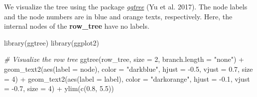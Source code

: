 \documentclass[]{article}
\newcommand{\hlnum}[1]{\textcolor[rgb]{0.816,0.125,0.439}{#1}}%
\newcommand{\hlstr}[1]{\textcolor[rgb]{0.251,0.627,0.251}{#1}}%
\newcommand{\hlcom}[1]{\textcolor[rgb]{0.502,0.502,0.502}{\textit{#1}}}%
\newcommand{\hlopt}[1]{\textcolor[rgb]{0,0,0}{#1}}%
\newcommand{\hlstd}[1]{\textcolor[rgb]{0.251,0.251,0.251}{#1}}%
\newcommand{\hlkwc}[1]{\textcolor[rgb]{0.251,0.251,0.251}{#1}}%
\newcommand{\hlkwd}[1]{\textcolor[rgb]{0.878,0.439,0.125}{#1}}%
\newenvironment{Shaded}{\begin{myshaded}}{\end{myshaded}}
\newcommand{\KeywordTok}[1]{\hlkwd{#1}}
\newcommand{\DataTypeTok}[1]{\hlkwc{#1}}
\newcommand{\DecValTok}[1]{\hlnum{#1}}
\newcommand{\FloatTok}[1]{\hlnum{#1}}
\newcommand{\StringTok}[1]{\hlstr{#1}}
\newcommand{\CommentTok}[1]{\hlcom{#1}}
\newcommand{\OperatorTok}[1]{\hlopt{#1}}
\newcommand{\NormalTok}[1]{\hlstd{#1}}
\begin{document}
\begin{Shaded}
\end{Shaded}

We visualize the tree using the package \emph{\href{https://bioconductor.org/packages/3.11/ggtree}{ggtree}} (Yu et al. 2017). The node labels and the node numbers are in blue and orange texts, respectively. Here, the
internal nodes of the \textbf{row\_tree} have no labels.

\begin{Shaded}
\begin{Highlighting}[]
\KeywordTok{library}\NormalTok{(ggtree)}
\KeywordTok{library}\NormalTok{(ggplot2)}

\CommentTok{# Visualize the row tree}
\KeywordTok{ggtree}\NormalTok{(row_tree, }\DataTypeTok{size =} \DecValTok{2}\NormalTok{, }\DataTypeTok{branch.length =} \StringTok{"none"}\NormalTok{) }\OperatorTok{+}
\KeywordTok{geom_text2}\NormalTok{(}\KeywordTok{aes}\NormalTok{(}\DataTypeTok{label =}\NormalTok{ node), }\DataTypeTok{color =} \StringTok{"darkblue"}\NormalTok{,}
                \DataTypeTok{hjust =} \FloatTok{-0.5}\NormalTok{, }\DataTypeTok{vjust =} \FloatTok{0.7}\NormalTok{, }\DataTypeTok{size =} \DecValTok{4}\NormalTok{) }\OperatorTok{+}
\KeywordTok{geom_text2}\NormalTok{(}\KeywordTok{aes}\NormalTok{(}\DataTypeTok{label =}\NormalTok{ label), }\DataTypeTok{color =} \StringTok{"darkorange"}\NormalTok{,}
            \DataTypeTok{hjust =} \FloatTok{-0.1}\NormalTok{, }\DataTypeTok{vjust =} \FloatTok{-0.7}\NormalTok{, }\DataTypeTok{size =} \DecValTok{4}\NormalTok{) }\OperatorTok{+}
\StringTok{  }\KeywordTok{ylim}\NormalTok{(}\KeywordTok{c}\NormalTok{(}\FloatTok{0.8}\NormalTok{, }\FloatTok{5.5}\NormalTok{))}
\end{Highlighting}
\end{Shaded}
\end{document}
